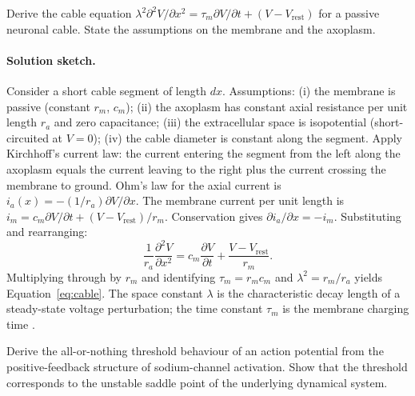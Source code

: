 \begin{exercise}
Derive the cable equation
$\lambda^2 \partial^2 V/\partial x^2 = \tau_m \partial V/\partial t + (V - V_{\text{rest}})$
for a passive neuronal cable. State the assumptions on the membrane
and the axoplasm.
\end{exercise}

\paragraph{Solution sketch.}
Consider a short cable segment of length $dx$. Assumptions: (i) the
membrane is passive (constant $r_m$, $c_m$); (ii) the axoplasm has
constant axial resistance per unit length $r_a$ and zero
capacitance; (iii) the extracellular space is isopotential
(short-circuited at $V = 0$); (iv) the cable diameter is constant
along the segment. Apply Kirchhoff's current law: the current entering
the segment from the left along the axoplasm equals the current
leaving to the right plus the current crossing the membrane to ground.
Ohm's law for the axial current is
$i_a(x) = -(1/r_a) \partial V/\partial x$. The membrane current per
unit length is $i_m = c_m \partial V/\partial t + (V - V_{\text{rest}})/r_m$.
Conservation gives $\partial i_a/\partial x = -i_m$. Substituting and
rearranging:
\[
\frac{1}{r_a} \frac{\partial^2 V}{\partial x^2}
= c_m \frac{\partial V}{\partial t} + \frac{V - V_{\text{rest}}}{r_m}.
\]
Multiplying through by $r_m$ and identifying $\tau_m = r_m c_m$ and
$\lambda^2 = r_m/r_a$ yields Equation~\ref{eq:cable}. The space
constant $\lambda$ is the characteristic decay length of a steady-state
voltage perturbation; the time constant $\tau_m$ is the membrane
charging time \cite{paper:v6c07-rall-1959}.

\begin{exercise}
Derive the all-or-nothing threshold behaviour of an action potential
from the positive-feedback structure of sodium-channel activation.
Show that the threshold corresponds to the unstable saddle point of
the underlying dynamical system.
\end{exercise}


